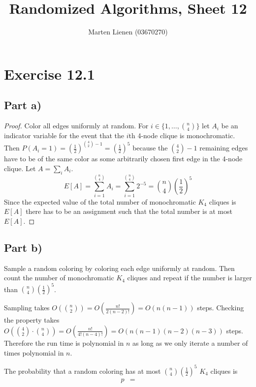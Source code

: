\documentclass[10pt,a4paper]{article}
\title{Randomized Algorithms, Sheet 12}
\author{Marten Lienen (03670270)}
\begin{document}
\maketitle

\section*{Exercise 12.1}

\subsection*{Part a)}

\begin{proof}
  Color all edges uniformly at random.
  For $i \in \{ 1, \dots, \binom{n}{4} \}$ let $A_{i}$ be an indicator variable for the event that the $i$th 4-node clique is monochromatic.
  Then $P(A_{i} = 1) = \left( \frac{1}{2} \right)^{\binom{4}{2} - 1} = \left( \frac{1}{2} \right)^{5}$ because the $\binom{4}{2} - 1$ remaining edges have to be of the same color as some arbitrarily chosen first edge in the 4-node clique.
  Let $A = \sum_{i} A_{i}$.
  \begin{equation*}
    E[A] = \sum_{i = 1}^{\binom{n}{4}} A_{i} = \sum_{i = 1}^{\binom{n}{4}} 2^{-5} = \binom{n}{4}\left( \frac{1}{2} \right)^{5}
  \end{equation*}
  Since the expected value of the total number of monochromatic $K_{4}$ cliques is $E[A]$ there has to be an assignment such that the total number is at most $E[A]$.
\end{proof}

\subsection*{Part b)}

Sample a random coloring by coloring each edge uniformly at random.
Then count the number of monochromatic $K_{4}$ cliques and repeat if the number is larger than $\binom{n}{4}\left( \frac{1}{2} \right)^{5}$.

Sampling takes $O\left( \binom{n}{2} \right) = O(\frac{n!}{2(n - 2)!}) = O\left(n(n - 1)\right)$ steps.
Checking the property takes $O\left( \binom{4}{2} \cdot \binom{n}{4} \right) = O\left( \frac{n!}{4! (n - 4)!} \right) = O\left( n(n - 1)(n - 2)(n - 3) \right)$ steps.
Therefore the run time is polynomial in $n$ as long as we only iterate a number of times polynomial in $n$.

The probability that a random coloring has at most $\binom{n}{4}\left( \frac{1}{2} \right)^{5}$ $K_{4}$ cliques is
\begin{align*}
  p & =
\end{align*}
\end{document}
